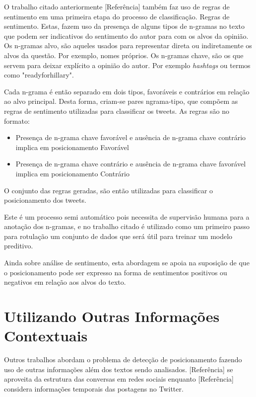 \quad O trabalho citado anteriormente [Referência] também faz uso de regras de
sentimento em uma primeira etapa do processo de classificação. Regras de
sentimento. Estas, fazem uso da presença de alguns tipos de n-gramas no texto que
podem ser indicativos do sentimento do autor para com os alvos da opinião.
Os n-gramas alvo, são aqueles usados para representar direta ou indiretamente os
alvos da questão. Por exemplo, nomes próprios. Os n-gramas chave, são os que servem
para deixar explícito a opinião do autor. Por exemplo \textit{hashtags} ou termos
como "readyforhillary". 

\quad Cada n-grama é então separado em dois tipos, favoráveis e contrários em relação
ao alvo principal. Desta forma, criam-se pares ngrama-tipo, que compõem as regras de
sentimento utilizadas para classificar os tweets. As regras são no formato:

\begin{itemize}
    \item Presença de n-grama chave favorável e ausência de n-grama chave contrário
    implica em posicionamento Favorável
    \item Presença de n-grama chave contrário e ausência de n-grama chave favorável
    implica em posicionamento Contrário 
\end{itemize}

\quad O conjunto das regras geradas, são então utilizadas para classificar o
posicionamento dos tweets.

\quad Este é um processo semi automático pois necessita de supervisão humana para a
anotação dos n-gramas, e no trabalho citado é utilizado como um primeiro passo para
rotulação um conjunto de dados que será útil para treinar um modelo preditivo.

\quad Ainda sobre análise de sentimento, esta abordagem se apoia na suposição de
que o posicionamento pode ser expresso na forma de sentimentos positivos ou
negativos em relação aos alvos do texto.

\section{Utilizando Outras Informações Contextuais}

\quad Outros trabalhos abordam o problema de detecção de posicionamento
fazendo uso de outras informações além dos textos sendo analisados. [Referência]
se aproveita da estrutura das conversas em redes sociais enquanto [Referência]
considera informações temporais das postagens no Twitter.

